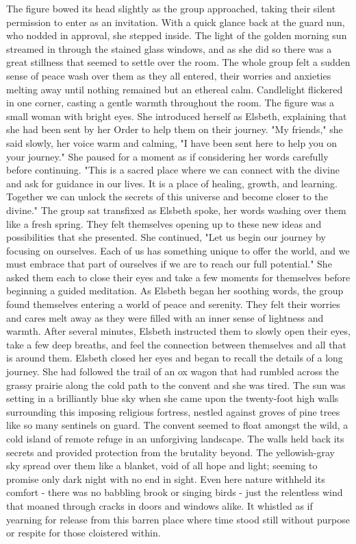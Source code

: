 \documentclass[11pt]{article}
\begin{document}
The figure bowed its head slightly as the group approached, taking their silent permission to enter as an invitation. With a quick glance back at the guard nun, who nodded in approval, she stepped inside. The light of the golden morning sun streamed in through the stained glass windows, and as she did so there was a great stillness that seemed to settle over the room.
The whole group felt a sudden sense of peace wash over them as they all entered, their worries and anxieties melting away until nothing remained but an ethereal calm. Candlelight flickered in one corner, casting a gentle warmth throughout the room.
The figure was a small woman with bright eyes. She introduced herself as Elsbeth, explaining that she had been sent by her Order to help them on their journey.
"My friends," she said slowly, her voice warm and calming, "I have been sent here to help you on your journey." She paused for a moment as if considering her words carefully before continuing. "This is a sacred place where we can connect with the divine and ask for guidance in our lives. It is a place of healing, growth, and learning. Together we can unlock the secrets of this universe and become closer to the divine."
The group sat transfixed as Elsbeth spoke, her words washing over them like a fresh spring. They felt themselves opening up to these new ideas and possibilities that she presented.
She continued, "Let us begin our journey by focusing on ourselves. Each of us has something unique to offer the world, and we must embrace that part of ourselves if we are to reach our full potential." She asked them each to close their eyes and take a few moments for themselves before beginning a guided meditation.
As Elsbeth began her soothing words, the group found themselves entering a world of peace and serenity. They felt their worries and cares melt away as they were filled with an inner sense of lightness and warmth. After several minutes, Elsbeth instructed them to slowly open their eyes, take a few deep breaths, and feel the connection between themselves and all that is around them.
Elsbeth closed her eyes and began to recall the details of a long journey. She had followed the trail of an ox wagon that had rumbled across the grassy prairie along the cold path to the convent and she was tired. The sun was setting in a brilliantly blue sky when she came upon the twenty-foot high walls surrounding this imposing religious fortress, nestled against groves of pine trees like so many sentinels on guard.
The convent seemed to float amongst the wild, a cold island of remote refuge in an unforgiving landscape. The walls held back its secrets and provided protection from the brutality beyond. The yellowish-gray sky spread over them like a blanket, void of all hope and light; seeming to promise only dark night with no end in sight. Even here nature withheld its comfort - there was no babbling brook or singing birds - just the relentless wind that moaned through cracks in doors and windows alike. It whistled as if yearning for release from this barren place where time stood still without purpose or respite for those cloistered within.
\end{document}
